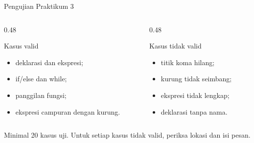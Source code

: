 \documentclass[aspectratio=169,10pt,t]{beamer}
\begin{document}
\begin{frame}{Pengujian Praktikum 3}
  \begin{columns}[T,onlytextwidth]
    \begin{column}{0.48\textwidth}
      \begin{block}{Kasus valid}
        \footnotesize
        \begin{itemize}
          \item deklarasi dan ekspresi;
          \item if/else dan while;
          \item panggilan fungsi;
          \item ekspresi campuran dengan kurung.
        \end{itemize}
      \end{block}
    \end{column}
    \begin{column}{0.48\textwidth}
      \begin{block}{Kasus tidak valid}
        \footnotesize
        \begin{itemize}
          \item titik koma hilang;
          \item kurung tidak seimbang;
          \item ekspresi tidak lengkap;
          \item deklarasi tanpa nama.
        \end{itemize}
      \end{block}
    \end{column}
  \end{columns}

  \vspace{4pt}
  {\footnotesize\color{ubbblue!80}Minimal 20 kasus uji. Untuk setiap
  kasus tidak valid, periksa lokasi dan isi pesan.}
\end{frame}
\end{document}
